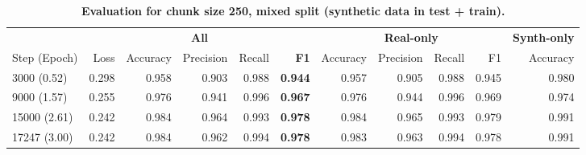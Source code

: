 \begin{table}[H]
\centering
\small
\caption[Evaluation for Chunk Size 250, Mixed Split]{\textbf{Evaluation for chunk size 250, mixed split (synthetic data in test + train).}}
\label{tab:250_mixed}
\begin{tabular}{@{}l *{10}{r} @{}}
\toprule
  & \multicolumn{5}{c}{\textbf{All}} 
  & \multicolumn{4}{c}{\textbf{Real-only}} 
  & \multicolumn{1}{c}{\textbf{Synth-only}} \\
\cmidrule(lr){2-6} \cmidrule(lr){7-10} \cmidrule(lr){11-11}
Step (Epoch) & Loss & Accuracy & Precision & Recall & \textbf{F1}
& Accuracy & Precision & Recall & F1
& Accuracy \\
\midrule
3000 (0.52)  & 0.298 & 0.958 & 0.903 & 0.988 & \textbf{0.944} & 0.957 & 0.905 & 0.988 & 0.945 & 0.980 \\
9000 (1.57)  & 0.255 & 0.976 & 0.941 & 0.996 & \textbf{0.967} & 0.976 & 0.944 & 0.996 & 0.969 & 0.974 \\
15000 (2.61) & 0.242 & 0.984 & 0.964 & 0.993 & \textbf{0.978} & 0.984 & 0.965 & 0.993 & 0.979 & 0.991 \\
17247 (3.00) & 0.242 & 0.984 & 0.962 & 0.994 & \textbf{0.978} & 0.983 & 0.963 & 0.994 & 0.978 & 0.991 \\
\bottomrule
\end{tabular}
\end{table}
